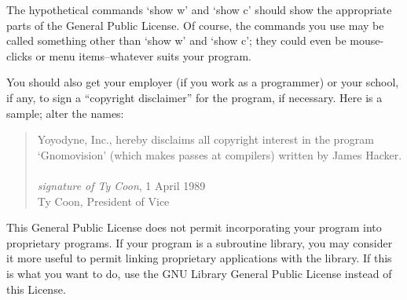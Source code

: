 \documentclass{uw-wkrpt}
\begin{document}
\begin{singlespacing}
The hypothetical commands `show w' and `show c' should show the appropriate
parts of the General Public License.  Of course, the commands you use may
be called something other than `show w' and `show c'; they could even be
mouse-clicks or menu items--whatever suits your program.

You should also get your employer (if you work as a programmer) or your
school, if any, to sign a ``copyright disclaimer'' for the program, if
necessary.  Here is a sample; alter the names:
\begin{quote}\ttfamily\footnotesize
  Yoyodyne, Inc., hereby disclaims all copyright interest in the program\\
  `Gnomovision' (which makes passes at compilers) written by James Hacker.\\
\mbox{}\\
  \emph{signature of Ty Coon}, 1 April 1989\\
  Ty Coon, President of Vice
\end{quote}

This General Public License does not permit incorporating your program into
proprietary programs.  If your program is a subroutine library, you may
consider it more useful to permit linking proprietary applications with the
library.  If this is what you want to do, use the GNU Library General
Public License instead of this License.

\end{singlespacing}
\end{document}
